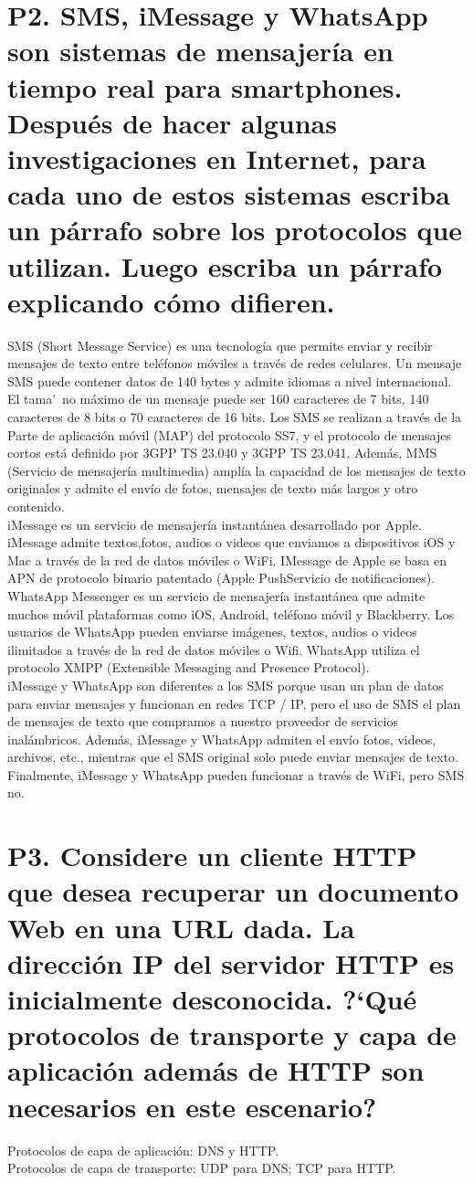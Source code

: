 \documentclass[a4paper, 11pt]{article}
\theoremstyle{definition} \theoremstyle{remark}
\begin{document}
     \section{P2. SMS, iMessage y WhatsApp son sistemas de mensajer\'ia en tiempo real para smartphones. Despu\'es de hacer algunas investigaciones en Internet, para cada uno de estos sistemas escriba un p\'arrafo sobre los protocolos que utilizan. Luego escriba un p\'arrafo explicando c\'omo difieren.}
     SMS (Short Message Service) es una tecnolog\'ia que permite enviar y recibir mensajes de texto entre tel\'efonos m\'oviles a trav\'es de redes celulares. Un mensaje SMS puede contener datos de 140 bytes y admite idiomas a nivel internacional. El tama\'~{n}o m\'aximo de un mensaje puede ser 160 caracteres de 7 bits, 140 caracteres de 8 bits o 70 caracteres de 16 bits. Los SMS se realizan a trav\'es de la Parte de aplicaci\'on m\'ovil (MAP) del protocolo SS7, y el protocolo de mensajes cortos est\'a definido por 3GPP TS 23.040 y 3GPP TS 23.041. Adem\'as, MMS (Servicio de mensajer\'ia multimedia) ampl\'ia la capacidad de los mensajes de texto originales y admite el env\'io de fotos, mensajes de texto m\'as largos y otro contenido.\\
     iMessage es un servicio de mensajer\'ia instant\'anea desarrollado por Apple. iMessage admite textos,fotos, audios o videos que enviamos a dispositivos iOS y Mac a trav\'es de la red de datos m\'oviles o WiFi. IMessage de Apple se basa en APN de protocolo binario patentado (Apple PushServicio de notificaciones).\\
     WhatsApp Messenger es un servicio de mensajer\'ia instant\'anea que admite muchos m\'ovil plataformas como iOS, Android, tel\'efono m\'ovil y Blackberry. Los usuarios de WhatsApp pueden enviarse im\'agenes, textos, audios o videos ilimitados a trav\'es de la red de datos m\'oviles o Wifi. WhatsApp utiliza el protocolo XMPP (Extensible Messaging and Presence Protocol).\\
     iMessage y WhatsApp son diferentes a los SMS porque usan un plan de datos para enviar mensajes y funcionan en redes TCP / IP, pero el uso de SMS el plan de mensajes de texto que compramos a nuestro proveedor de servicios inal\'ambricos. Adem\'as, iMessage y WhatsApp admiten el env\'io fotos, videos, archivos, etc., mientras que el SMS original solo puede enviar mensajes de texto. Finalmente, iMessage y WhatsApp pueden funcionar a trav\'es de WiFi, pero SMS no.

     \section{P3. Considere un cliente HTTP que desea recuperar un documento Web en una URL dada. La direcci\'on IP del servidor HTTP es inicialmente desconocida. ?`Qu\'e protocolos de transporte y capa de aplicaci\'on adem\'as de HTTP son necesarios en este escenario?}
     Protocolos de capa de aplicaci\'on: DNS y HTTP.\\
     Protocolos de capa de transporte: UDP para DNS; TCP para HTTP.
\end{document}
